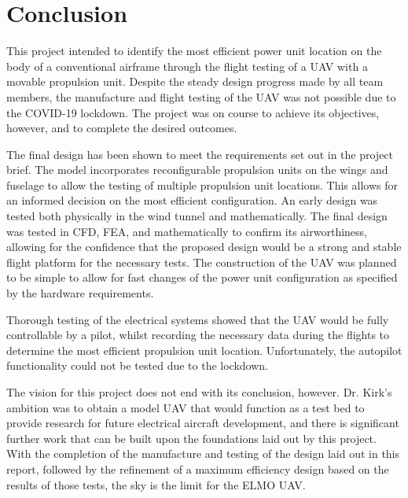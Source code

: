 \documentclass[../../main.tex]{subfiles}
\begin{document}
\section{Conclusion} \label{sec:project-review:conclusion}

This project intended to identify the most efficient power unit location on the body of a conventional airframe through the flight testing of a UAV with a movable propulsion unit.
Despite the steady design progress made by all team members, the manufacture and flight testing of the UAV was not possible due to the COVID-19 lockdown.
The project was on course to achieve its objectives, however, and to complete the desired outcomes.  

The final design has been shown to meet the requirements set out in the project brief.
The model incorporates reconfigurable propulsion units on the wings and fuselage to allow the testing of multiple propulsion unit locations.
This allows for an informed decision on the most efficient configuration.
An early design was tested both physically in the wind tunnel and mathematically.
The final design was tested in CFD, FEA, and mathematically to confirm its airworthiness, allowing for the confidence that the proposed design would be a strong and stable flight platform for the necessary tests.
The construction of the UAV was planned to be simple to allow for fast changes of the power unit configuration as specified by the hardware requirements. 

Thorough testing of the electrical systems showed that the UAV would be fully controllable by a pilot, whilst recording the necessary data during the flights to determine the most efficient propulsion unit location.
Unfortunately, the autopilot functionality could not be tested due to the lockdown.  

The vision for this project does not end with its conclusion, however.
Dr. Kirk's ambition was to obtain a model UAV that would function as a test bed to provide research for future electrical aircraft development, and there is significant further work that can be built upon the foundations laid out by this project.
With the completion of the manufacture and testing of the design laid out in this report, followed by the refinement of a maximum efficiency design based on the results of those tests, the sky is the limit for the ELMO UAV. 
\end{document}
